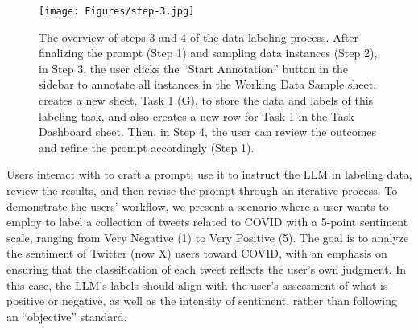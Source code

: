\begin{figure*}[t]
    \centering
    \texttt{[image: Figures/step-3.jpg]}
    \caption{The overview of steps 3 and 4 of the data labeling process. After finalizing the prompt (Step 1) and sampling data instances (Step 2), in Step 3, the user clicks the ``Start Annotation'' button in the sidebar to annotate all instances in the Working Data Sample sheet. \system creates a new sheet, Task 1 (G), to store the data and labels of this labeling task, and also creates a new row for Task 1 in the Task Dashboard sheet. Then, in Step 4, the user can review the outcomes and refine the prompt accordingly (Step 1).
}
    \label{fig:system-interface-step-3-4-kenneth}
\end{figure*}

Users interact with \system to craft a prompt, use it to instruct the LLM in labeling data, review the results, and then revise the prompt through an iterative process. 
To demonstrate the users' workflow, we present a scenario where a user wants to employ \system to label a collection of tweets related to COVID with a 5-point sentiment scale, ranging from Very Negative (1) to Very Positive (5).
The goal is to analyze the sentiment of Twitter (now X) users toward COVID, with an emphasis on ensuring that the classification of each tweet reflects the user's own judgment.
In this case, the LLM's labels should align with the user's assessment of what is positive or negative, as well as the intensity of sentiment, rather than following an ``objective'' standard.


